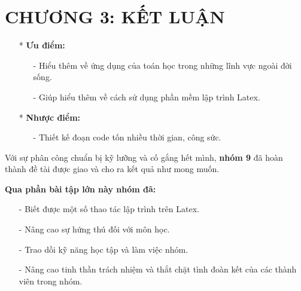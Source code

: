 \documentclass[12pt,a4paper]{article}
\begin{document}
\newpage
{}
\section*{CHƯƠNG 3: KẾT LUẬN}
\begin{itemize}
	\item[*] \textbf{Ưu điểm:}
	      \begin{itemize}
		      \item[-] Hiểu thêm về ứng dụng của toán học trong những lĩnh vực ngoài đời sống.
		      \item[-] Giúp hiểu thêm về cách sử dụng phần mềm lập trình Latex.
	      \end{itemize}
	\item[*] \textbf{Nhược điểm:}
	      \begin{itemize}
		      \item[-] Thiết kế đoạn code tốn nhiều thời gian, công sức.
	      \end{itemize}
\end{itemize}

\vspace{2em}
Với sự phân công chuẩn bị kỹ lưỡng và cố gắng hết mình, \textbf{nhóm 9} đã hoàn thành đề tài được giao và cho ra kết quả như mong muốn.

\vspace{2em}
\textbf{Qua phần bài tập lớn này nhóm đã:}
\begin{itemize}
	\item[-] Biết được một số thao tác lập trình trên Latex.
	\item[-] Nâng cao sự hứng thú đối với môn học.
	\item[-] Trao dồi kỹ năng học tập và làm việc nhóm.
	\item[-] Nâng cao tinh thần trách nhiệm và thắt chặt tình đoàn kết của các thành viên trong nhóm.
\end{itemize}

\newpage
{}
\end{document}
